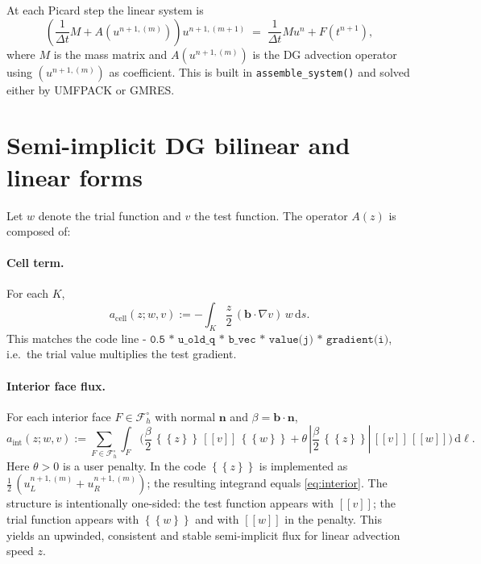 \documentclass[11pt]{article}
\newcommand{\avg}[1]{\left\{\!\!\left\{#1\right\}\!\!\right\}}
\newcommand{\jump}[1]{\left[\!\left[#1\right]\!\right]}
\newcommand{\dt}{\Delta t}
\newcommand{\Fh}{\mathcal{F}_h}
\newcommand{\Kh}{K}
\begin{document}
At each Picard step the linear system is
\begin{equation}
\left(\frac{1}{\dt}M + A(u^{n+1,(m)})\right) u^{n+1,(m+1)} \;=\; \frac{1}{\dt}M u^n + F(t^{n+1}),
\label{eq:time_system}
\end{equation}
where $M$ is the mass matrix and $A(u^{n+1,(m)})$ is the DG advection operator using $(u^{n+1,(m)})$ as coefficient. This is built in \texttt{assemble\_system()} and solved either by UMFPACK or GMRES.

\section{Semi-implicit DG bilinear and linear forms}
Let $w$ denote the trial function and $v$ the test function. The operator $A(z)$ is composed of:
\paragraph{Cell term.}
For each $\Kh$,
\begin{equation}
a_{\text{cell}}(z; w,v)
:= - \int_{\Kh} \frac{z}{2}\, (\bm b\cdot\nabla v)\, w \,\mathrm ds .
\label{eq:cell}
\end{equation}
This matches the code line
\(\texttt{- 0.5 * u\_old\_q * b\_vec * value(j) * gradient(i)}\),
i.e.\ the trial value multiplies the test gradient.

\paragraph{Interior face flux.}
For each interior face $F\in\Fh^\circ$ with normal $\bm n$ and $\beta=\bm b\cdot\bm n$,
\begin{equation}
a_{\text{int}}(z; w,v)
:= \sum_{F\in\Fh^\circ}\int_F
\Big(
\frac\beta2\,\avg{z}\,\jump{v}\,\avg{w}
+ \theta\,\left|\frac\beta2\,\avg{z}\right|\,\jump{v}\,\jump{w}
\Big)\,\mathrm d\ell .
\label{eq:interior}
\end{equation}
Here $\theta>0$ is a user penalty. In the code
\(\avg{z}\) is implemented as \(\tfrac12\,(u_L^{n+1,(m)}+u_R^{n+1,(m)})\); the resulting integrand equals \eqref{eq:interior}. The structure is intentionally one-sided: the test function appears with $\jump{v}$; the trial function appears with $\avg{w}$ and with $\jump{w}$ in the penalty. This yields an upwinded, consistent and stable semi-implicit flux for linear advection speed \(z\).
\end{document}
